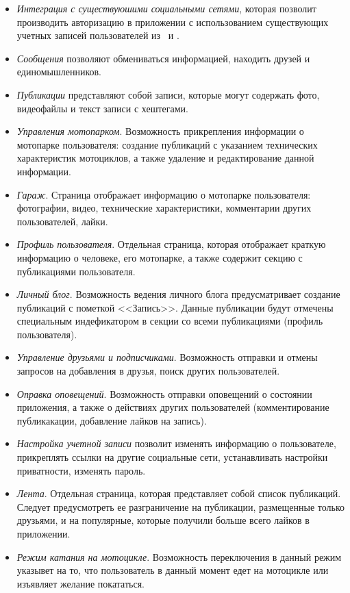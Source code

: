 \begin{itemize}
	\item \emph{Интеграция с существуюшими социальными сетями}, которая позволит производить авторизацию в приложении с использованием существующих учетных записей пользователей из \facebook~и \vk.
	\item \emph{Сообщения} позволяют обмениваться информацией, находить друзей и единомышленников.
	\item \emph{Публикации} представляют собой записи, которые могут содержать фото, видеофайлы и текст записи с хештегами.
	\item \emph{Управления мотопарком}. Возможность прикрепления информации о мотопарке пользователя: создание публикаций с указанием технических характеристик мотоциклов, а также удаление и редактирование данной информации.
	\item \emph{Гараж}. Страница отображает информацию о мотопарке пользователя: фотографии, видео, технические характеристики, комментарии других пользователей, лайки. 
	\item \emph{Профиль пользователя}. Отдельная страница, которая отображает краткую информацию о человеке, его мотопарке, а также содержит секцию с публикациями пользователя.
	\item \emph{Личный блог}. Возможность ведения личного блога предусматривает создание публикаций с пометкой <<Запись>>. Данные публикации будут отмечены специальным индефикатором в секции со всеми публикациями (профиль пользователя).
	\item \emph{Управление друзьями и подписчиками}. Возможность отправки и отмены запросов на добавления в друзья, поиск других пользователей.
	\item \emph{Оправка оповещений}. Возможность отправки оповещений о состоянии приложения, а также о действиях других пользователей (комментирование публикакации, добавление лайков на запись).
	\item \emph{Настройка учетной записи} позволит изменять информацию о пользователе, прикреплять ссылки на другие социальные сети, устанавливать настройки приватности, изменять пароль.
	\item \emph{Лента}. Отдельная страница, которая представляет собой список публикаций. Следует предусмотреть ее разграничение на публикации, размещенные только друзьями, и на популярные, которые получили больше всего лайков в приложении.
	\item \emph{Режим катания на мотоцикле}. Возможность переключения в данный режим указывет на то, что пользователь в данный момент едет на мотоцикле или изъявляет желание покататься.

\end{itemize}
